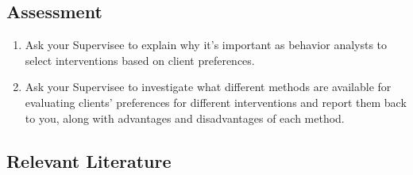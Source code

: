 \subsection{Assessment}
\begin{enumerate}
\item Ask your Supervisee to explain why it's important as behavior analysts to select interventions based on client preferences. 
\item Ask your Supervisee to investigate what different methods are available for evaluating clients' preferences for different interventions and report them back to you, along with advantages and disadvantages of each method.
\end{enumerate}
%
\subsection{Relevant Literature}
\begin{refsection}
\nocite{test,alang2017police,clayton2018black}
\printbibliography[heading=none]
\end{refsection}

